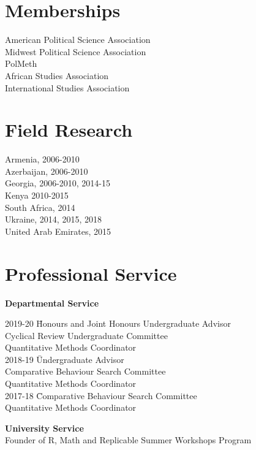 \documentclass[margin,line]{res}
\begin{document}
{\begin{resume}
\section{\sc Memberships}
American Political Science Association \\
Midwest Political Science Association\\
PolMeth\\
African Studies Association\\
International Studies Association

\section{\sc Field Research}
Armenia, 2006-2010  \\
Azerbaijan, 2006-2010\\
Georgia, 2006-2010, 2014-15 \\
Kenya 2010-2015 \\
South Africa, 2014 \\
Ukraine, 2014, 2015, 2018 \\
United Arab Emirates, 2015 \\


\section{\sc  Professional Service}
\textbf{Departmental Service}\\
\vspace{-3em}
\begin{tabbing}
2019-20    \=  Honours and Joint Honours Undergraduate Advisor\\
 \> Cyclical Review Undergraduate Committee \\
\> Quantitative Methods Coordinator \\

2018-19    \=  Undergraduate Advisor\\
\> Comparative Behaviour Search Committee\\
\> Quantitative Methods Coordinator \\
2017-18    \=  Comparative Behaviour Search Committee\\
\> Quantitative Methods Coordinator
\end{tabbing}

\textbf{University Service}\\
Founder of R, Math and Replicable Summer Workshops Program


\end{resume}}
\end{document}
